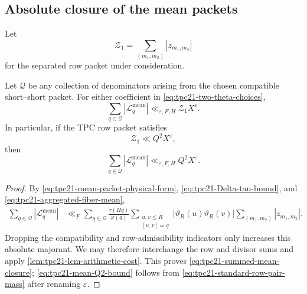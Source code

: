 \subsection{Absolute closure of the mean packets}

Let
\begin{equation}
 \mathcal Z_1=\sum_{(m_1,m_2)}|z_{m_1,m_2}|
 \label{eq:tpc21-row-pair-l1-mass}
\end{equation}
for the separated row packet under consideration.

\begin{theorem}
\label{thm:tpc21-summed-mean-closure}
Let \(\mathcal Q\) be any collection of denominators arising from the
chosen compatible short--short packet.  For either coefficient in
\eqref{eq:tpc21-two-theta-choices},
\begin{equation}
 \boxed{
 \sum_{q\in\mathcal Q}|\mathcal L_q^{\mathrm{mean}}|
 \ll_{\varepsilon,F,H}\mathcal Z_1X^\varepsilon.}
 \label{eq:tpc21-summed-mean-closure}
\end{equation}
In particular, if the TPC row packet satisfies
\begin{equation}
 \mathcal Z_1\ll Q^2X^\varepsilon,
 \label{eq:tpc21-standard-row-pair-mass}
\end{equation}
then
\begin{equation}
 \sum_{q\in\mathcal Q}|\mathcal L_q^{\mathrm{mean}}|
 \ll_{\varepsilon,F,H}Q^2X^\varepsilon.
 \label{eq:tpc21-mean-Q2-bound}
\end{equation}
\end{theorem}

\begin{proof}
By \eqref{eq:tpc21-mean-packet-physical-form},
\eqref{eq:tpc21-Delta-tau-bound}, and
\eqref{eq:tpc21-aggregated-fiber-mean},
\begin{align*}
 \sum_{q\in\mathcal Q}|\mathcal L_q^{\mathrm{mean}}|
 &\ll_F
 \sum_{q\in\mathcal Q}\frac{\tau(Hq)}{\varphi(q)}
 \sum_{\substack{u,v\le R\\{}[u,v]=q}}
 |\vartheta_R(u)\vartheta_R(v)|
 \sum_{(m_1,m_2)}|z_{m_1,m_2}|.
\end{align*}
Dropping the compatibility and row-admissibility indicators only
increases this absolute majorant.  We may therefore interchange the
row and divisor sums and apply
\cref{lem:tpc21-lcm-arithmetic-cost}.  This proves
\eqref{eq:tpc21-summed-mean-closure};
\eqref{eq:tpc21-mean-Q2-bound} follows from
\eqref{eq:tpc21-standard-row-pair-mass} after renaming
\(\varepsilon\).
\end{proof}

